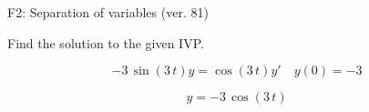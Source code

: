 \begin{exercise}
  \begin{exerciseTitle}F2: Separation of variables (ver. 81)\end{exerciseTitle}
  \begin{exerciseStatement}
    
Find the solution to the given IVP.

    
\[-3 \, \sin\left(3 \, t\right) y= \cos\left(3 \, t\right) y'\hspace{1em} y\left( 0 \right)= -3\]

  \end{exerciseStatement}
  \begin{exerciseAnswer}
    
\[y= -3 \, \cos\left(3 \, t\right)\]

  \end{exerciseAnswer}
\end{exercise}